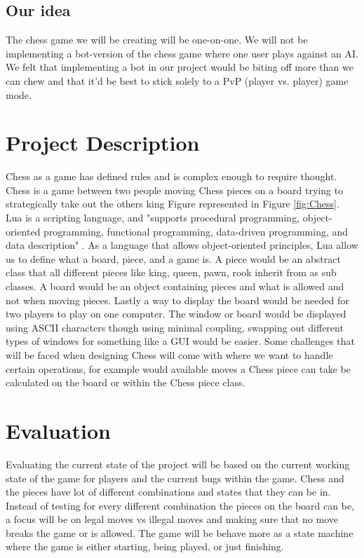 \documentclass[a4paper]{article}
\begin{document}
\subsection{Our idea}
The chess game we will be creating will be one-on-one. We will not be implementing a bot-version of the chess game where one user plays against an AI. We felt that implementing a bot in our project would be biting off more than we can chew and that it'd be best to stick solely to a PvP (player vs. player) game mode. 

\section{Project Description}

Chess as a game has defined rules and is complex enough to require thought.  Chess is a game between two people moving Chess pieces on a board trying to strategically take out the others king Figure represented in Figure \ref{fig:Chess}.  Lua is a scripting language, and "supports procedural programming, object-oriented programming, functional programming, data-driven programming, and data description" \cite{Lua}.  As a language that allows object-oriented principles, Lua allow us to define what a board, piece, and a game is.  A piece would be an abstract class that all different pieces like king, queen, pawn, rook inherit from as sub classes.  A board would be an object containing pieces and what is allowed and not when moving pieces.  Lastly a way to display the board would be needed for two players to play on one computer.  The window or board would be displayed using ASCII characters though using minimal coupling, swapping out different types of windows for something like a GUI would be easier.  Some challenges that will be faced when designing Chess will come with where we want to handle certain operations, for example would available moves a Chess piece can take be calculated on the board or within the Chess piece class.

\section{Evaluation}

Evaluating the current state of the project will be based on the current working state of the game for players and the current bugs within the game.  Chess and the pieces have lot of different combinations and states that they can be in.  Instead of testing for every different combination the pieces on the board can be, a focus will be on legal moves vs illegal moves and making sure that no move breaks the game or is allowed.  The game will be behave more as a state machine where the game is either starting, being played, or just finishing.
\end{document}
